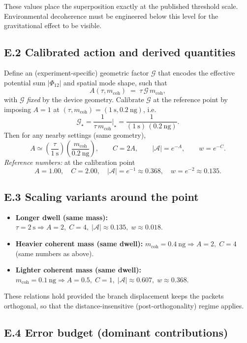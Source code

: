\documentclass[11pt,letterpaper]{article}
\theoremstyle{definition}
\begin{document}
These values place the superposition exactly at the published threshold scale. Environmental decoherence must be engineered below this level for the gravitational effect to be visible.
\subsection*{E.2 Calibrated action and derived quantities}

Define an (experiment-specific) geometric factor \(\mathcal G\) that encodes the effective potential sum \(|\Phi_{12}|\) and spatial mode shape, such that
\[
A(\tau,m_{\mathrm{coh}})\;=\;\tau\,\mathcal G\,m_{\mathrm{coh}},
\]
with \(\mathcal G\) \emph{fixed} by the device geometry. Calibrate \(\mathcal G\) at the reference point by imposing \(A=1\) at \((\tau,m_{\mathrm{coh}})=(1~\mathrm{s},0.2~\mathrm{ng})\), i.e.
\[
\mathcal G_{\star}=\frac{1}{\tau\,m_{\mathrm{coh}}}\Big|_{\star}
=\frac{1}{(1~\mathrm{s})\,(0.2~\mathrm{ng})}.
\]
Then for any nearby settings (same geometry),
\[
A\simeq \left(\frac{\tau}{1~\mathrm{s}}\right)\!\left(\frac{m_{\mathrm{coh}}}{0.2~\mathrm{ng}}\right),\qquad
C=2A,\qquad
|\mathcal A|=e^{-A},\qquad
w=e^{-C}.
\]
\emph{Reference numbers:} at the calibration point
\[
A=1.00,\quad C=2.00,\quad |\mathcal A|=e^{-1}\approx 0.368,\quad w=e^{-2}\approx 0.135.
\]

\subsection*{E.3 Scaling variants around the point}

\begin{itemize}
\item \textbf{Longer dwell (same mass):} \(\tau=2~\mathrm{s}\Rightarrow A=2,\; C=4,\; |\mathcal A|\approx 0.135,\; w\approx 0.018\).
\item \textbf{Heavier coherent mass (same dwell):} \(m_{\mathrm{coh}}=0.4~\mathrm{ng}\Rightarrow A=2,\; C=4\) (same numbers as above).
\item \textbf{Lighter coherent mass (same dwell):} \(m_{\mathrm{coh}}=0.1~\mathrm{ng}\Rightarrow A=0.5,\; C=1,\; |\mathcal A|\approx 0.607,\; w\approx 0.368\).
\end{itemize}

These relations hold provided the branch displacement keeps the packets orthogonal, so that the distance-insensitive (post-orthogonality) regime applies.
\subsection*{E.4 Error budget (dominant contributions)}
\end{document}
